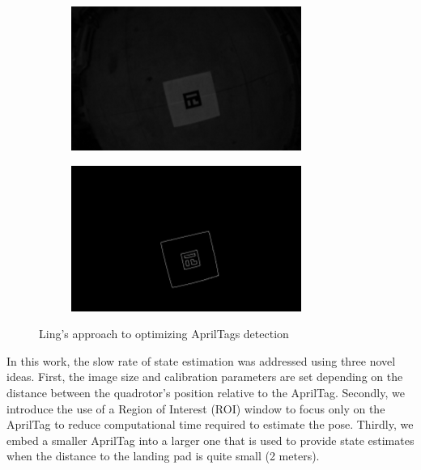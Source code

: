 \documentclass[11pt, twocolumn]{article}
\begin{document}
\begin{figure}[H]
	\centering
	\begin{subfigure}[b]{0.45\linewidth}
		\includegraphics[width=\textwidth]{images/ling_apriltags_1.png}
	\end{subfigure}
	\begin{subfigure}[b]{0.45\linewidth}
		\includegraphics[width=\textwidth]{images/ling_apriltags_2.png}
	\end{subfigure}
	\caption{Ling's approach to optimizing AprilTags detection \cite{Ling2014}}
	\label{fig:ling_apriltags}
	\vspace{-0.4cm}
\end{figure}

In this work, the slow rate of state estimation was addressed using three novel ideas. First, the image size and calibration parameters are set depending on the distance between the quadrotor's position relative to the AprilTag. Secondly, we introduce the use of a Region of Interest (ROI) window to focus only on the AprilTag to reduce computational time required to estimate the pose. Thirdly, we embed a smaller AprilTag into a larger one that is used to provide state estimates when the distance to the landing pad is quite small (2 meters). 
\end{document}
